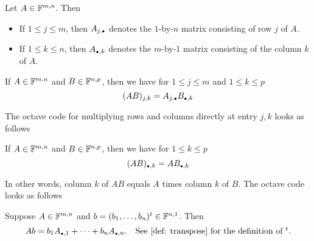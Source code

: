 \begin{mydef}  Let $A\in \mathbb{F}^{m,n}$. Then
  \begin{itemize}
    \item If $1 \leq j \leq m$, then $A_{j, \mathsmaller{\bullet}}$ denotes the $1$-by-$n$ matrix consisting of row $j$ of $A$.
    \item If $1 \leq k \leq n$, then  $A_{\mathsmaller{\bullet}, k}$ denotes the $m$-by-$1$ matrix consisting of the column $k$ of $A$.
  \end{itemize}
\end{mydef}

\setcounter{thm}{45}
\begin{thm} 
  If $A \in \mathbb{F}^{m,n}$ and $B \in \mathbb{F}^{n,p}$, then we have for $1 \leq j \leq m$ and $1 \leq k \leq p$
  \begin{equation}
    (AB)_{j,k} = A_{j, \mathsmaller{\bullet}} B_{\mathsmaller{\bullet}, k}
  \end{equation}

  \begin{minipage}{\linewidth}
    The octave code for multiplying rows and columns directly at entry $j,k$ looks as follows

  \end{minipage}
\end{thm}

\setcounter{thm}{47}
\begin{thm}
  If $A \in \mathbb{F}^{m,n}$ and $B \in \mathbb{F}^{n,p}$, then we have for $1 \leq k \leq p$
  \begin{equation}
    (AB)_{\mathsmaller{\bullet}, k} = AB_{\mathsmaller{\bullet}, k}
  \end{equation}

  In other words, column $k$ of $AB$ equals $A$ times column $k$ of $B$. The octave code looks as follows


\end{thm}

\setcounter{thm}{49}
\begin{thm}
  Suppose $A \in \mathbb{F}^{m,n}$ and  $b = (b_1, \ldots, b_n)^{t}\in \mathbb{F}^{n,1}$. Then
  \begin{equation}
    Ab = b_1 A_{\mathsmaller{\bullet}, 1} + \dots + b_n A_{\mathsmaller{\bullet},n}. \quad $See \ref{def: transpose} for the definition of $^t.
  \end{equation}
\end{thm}

